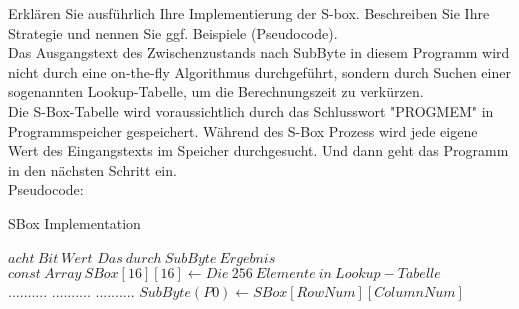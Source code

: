 \documentclass[abstract,bibliography=totocnumbered,listof=leveldown,open=any,titlepage]{scrreprt}
\begin{document}
		Erklären Sie ausführlich Ihre Implementierung der S-box. 
		Beschreiben Sie Ihre Strategie und nennen Sie ggf. Beispiele (Pseudocode). 	\vspace{1em} \\
		Das Ausgangstext des Zwischenzustands nach SubByte in diesem Programm wird nicht durch eine on-the-fly Algorithmus durchgeführt, 
		sondern durch Suchen einer sogenannten Lookup-Tabelle, um die Berechnungszeit zu verkürzen.	\vspace{1mm} \\
		Die S-Box-Tabelle wird voraussichtlich durch das Schlusswort "PROGMEM" in Programmspeicher gespeichert. Während des S-Box Prozess wird jede eigene Wert des Eingangstexts im Speicher durchgesucht. Und dann geht das Programm in den nächsten Schritt ein.\vspace{1mm}\\
		Pseudocode: 
		\begin{algorithm}  %
			\caption{SBox Implementation}   %
			\label{alg1} %
			\begin{algorithmic}                    %
				\REQUIRE $acht\ Bit\ Wert$
				\ENSURE $Das\ durch\ SubByte\ Ergebnis$
				\STATE$const\ Array\ SBox[16][16] \gets Die\ 256\ Elemente\ in\ Lookup-Tabelle$\\
				\STATE $..........$
				\STATE $..........$
				\STATE $..........$
				\STATE $SubByte(P0) \gets SBox[RowNum][ColumnNum]$
			\end{algorithmic}
		\end{algorithm}
\end{document}
